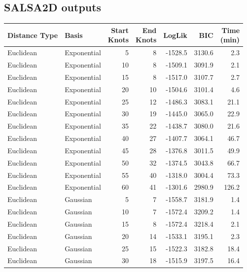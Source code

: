 \clearpage



\subsection{SALSA2D outputs}

\begin{table}[!htb]
\begin{longtable}{|l|l|r|r|r|r|r|}
\hline
Distance Type & Basis & \makecell[r]{Start \\Knots} & \makecell[l]{End \\Knots} & LogLik & BIC & \makecell[l]{Time \\(min)}\\
\hline
Euclidean & Exponential & 5 & 8 & -1528.5 & 3130.6 & 2.3\\
\hline
Euclidean & Exponential & 10 & 8 & -1509.1 & 3091.9 & 2.1\\
\hline
Euclidean & Exponential & 15 & 8 & -1517.0 & 3107.7 & 2.7\\
\hline
Euclidean & Exponential & 20 & 10 & -1504.6 & 3101.4 & 4.6\\
\hline
Euclidean & Exponential & 25 & 12 & -1486.3 & 3083.1 & 21.1\\
\hline
Euclidean & Exponential & 30 & 19 & -1445.0 & 3065.0 & 22.9\\
\hline
Euclidean & Exponential & 35 & 22 & -1438.7 & 3080.0 & 21.6\\
\hline
Euclidean & Exponential & 40 & 27 & -1407.7 & 3064.1 & 46.7\\
\hline
Euclidean & Exponential & 45 & 28 & -1376.8 & 3011.5 & 49.9\\
\hline
Euclidean & Exponential & 50 & 32 & -1374.5 & 3043.8 & 66.7\\
\hline
Euclidean & Exponential & 55 & 40 & -1318.0 & 3004.4 & 73.3\\
\hline
Euclidean & Exponential & 60 & 41 & -1301.6 & 2980.9 & 126.2\\
\hline
Euclidean & Gaussian & 5 & 7 & -1558.7 & 3181.9 & 1.4\\
\hline
Euclidean & Gaussian & 10 & 7 & -1572.4 & 3209.2 & 1.4\\
\hline
Euclidean & Gaussian & 15 & 8 & -1572.4 & 3218.4 & 2.1\\
\hline
Euclidean & Gaussian & 20 & 14 & -1533.1 & 3195.1 & 2.3\\
\hline
Euclidean & Gaussian & 25 & 15 & -1522.3 & 3182.8 & 18.4\\
\hline
Euclidean & Gaussian & 30 & 18 & -1515.9 & 3197.5 & 16.4\\

\end{longtable}
\end{table}
